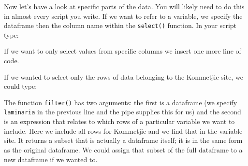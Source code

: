 \documentclass[]{book}
\newenvironment{Shaded}{\begin{snugshade}}{\end{snugshade}}
\newcommand{\KeywordTok}[1]{\textcolor[rgb]{0.13,0.29,0.53}{\textbf{#1}}}
\newcommand{\DecValTok}[1]{\textcolor[rgb]{0.00,0.00,0.81}{#1}}
\newcommand{\StringTok}[1]{\textcolor[rgb]{0.31,0.60,0.02}{#1}}
\newcommand{\CommentTok}[1]{\textcolor[rgb]{0.56,0.35,0.01}{\textit{#1}}}
\newcommand{\OperatorTok}[1]{\textcolor[rgb]{0.81,0.36,0.00}{\textbf{#1}}}
\newcommand{\NormalTok}[1]{#1}
\theoremstyle{definition}
\theoremstyle{definition}
\theoremstyle{definition}
\theoremstyle{remark}
\begin{document}
Now let's have a look at specific parts of the data. You will likely
need to do this in almost every script you write. If we want to refer to
a variable, we specify the dataframe then the column name within the
\texttt{select()} function. In your script type:

\begin{Shaded}
\end{Shaded}

If we want to only select values from specific columns we insert one
more line of code.

\begin{Shaded}
\end{Shaded}

If we wanted to select only the rows of data belonging to the Kommetjie
site, we could type:

\begin{Shaded}
\end{Shaded}

The function \texttt{filter()} has two arguments: the first is a
dataframe (we specify \texttt{laminaria} in the previous line and the
pipe supplies this for us) and the second is an expression that relates
to which rows of a particular variable we want to include. Here we
include all rows for Kommetjie and we find that in the variable site. It
returns a subset that is actually a dataframe itself; it is in the same
form as the original dataframe. We could assign that subset of the full
dataframe to a new dataframe if we wanted to.
\end{document}
